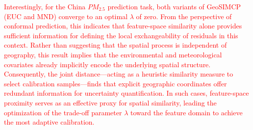 \documentclass[authoryear,preprint,review,12pt]{elsarticle}
\begin{document}
\textcolor{red}{Interestingly, for the China $PM_{2.5}$ prediction task, both variants of GeoSIMCP (EUC and MND) converge to an optimal $\lambda$ of zero. From the perspective of conformal prediction, this indicates that feature-space similarity alone provides sufficient information for defining the local exchangeability of residuals in this context. Rather than suggesting that the spatial process is independent of geography, this result implies that the environmental and meteorological covariates already implicitly encode the underlying spatial structure. Consequently, the joint distance—acting as a heuristic similarity measure to select calibration samples—finds that explicit geographic coordinates offer redundant information for uncertainty quantification. In such cases, feature-space proximity serves as an effective proxy for spatial similarity, leading the optimization of the trade-off parameter $\lambda$ toward the feature domain to achieve the most adaptive calibration.}
\end{document}
